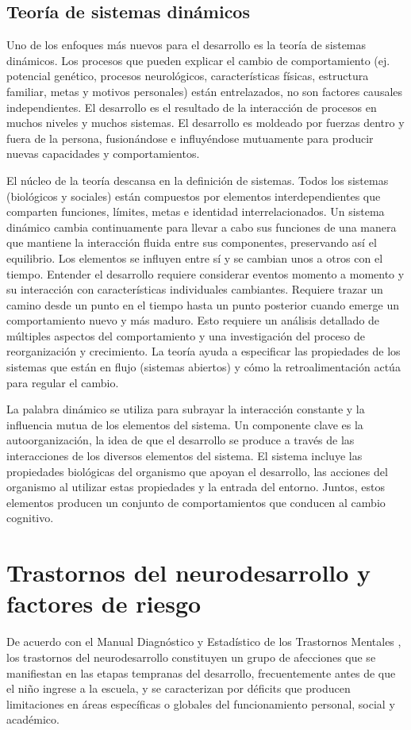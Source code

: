 \documentclass[11pt,letterpaper]{report}
\begin{document}
\subsection{Teoría de sistemas dinámicos}
Uno de los enfoques más nuevos para el desarrollo es la teoría de sistemas
dinámicos. Los procesos que pueden explicar el cambio de comportamiento (ej.
potencial genético, procesos neurológicos, características físicas,
estructura familiar, metas y motivos personales) están entrelazados, no son
factores causales independientes. El desarrollo es el resultado de la
interacción de procesos en muchos niveles y muchos sistemas. El desarrollo es
moldeado por fuerzas dentro y fuera de la persona, fusionándose e influyéndose
mutuamente para producir nuevas capacidades y comportamientos. \cite{Newman2020}

El núcleo de la teoría descansa en la definición de sistemas. Todos los
sistemas (biológicos y sociales) están compuestos por elementos
interdependientes que comparten funciones, límites, metas e identidad
interrelacionados. Un sistema dinámico cambia continuamente para llevar a cabo
sus funciones de una manera que mantiene la interacción fluida entre sus
componentes, preservando así el equilibrio. Los elementos se influyen entre sí
y se cambian unos a otros con el tiempo. Entender el desarrollo requiere
considerar eventos momento a momento y su interacción con características
individuales cambiantes. Requiere trazar un camino desde un punto en el tiempo
hasta un punto posterior cuando emerge un comportamiento nuevo y más maduro.
Esto requiere un análisis detallado de múltiples aspectos del comportamiento y
una investigación del proceso de reorganización y crecimiento. La teoría ayuda
a especificar las propiedades de los sistemas que están en flujo (sistemas
abiertos) y cómo la retroalimentación actúa para regular el cambio.
\cite{Feldman3}

La palabra dinámico se utiliza para subrayar la interacción constante y la
influencia mutua de los elementos del sistema. Un componente clave es la
autoorganización, la idea de que el desarrollo se produce a través de las
interacciones de los diversos elementos del sistema. El sistema incluye las
propiedades biológicas del organismo que apoyan el desarrollo, las acciones del
organismo al utilizar estas propiedades y la entrada del entorno. Juntos,
estos elementos producen un conjunto de comportamientos que conducen al cambio
cognitivo. \cite{Gauvain2022}

\section{Trastornos del neurodesarrollo y factores de riesgo}
De acuerdo con el Manual Diagnóstico y Estadístico de los Trastornos Mentales
\cite{DSM5TR}, los trastornos del neurodesarrollo constituyen un grupo de 
afecciones que se manifiestan en las etapas tempranas del desarrollo, 
frecuentemente antes de que el niño ingrese a la escuela, y se caracterizan 
por déficits que producen limitaciones en áreas específicas o globales del
funcionamiento personal, social y académico.
\end{document}
